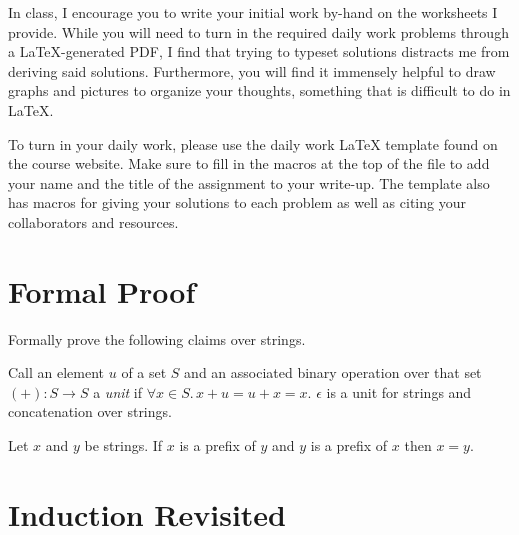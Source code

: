 \documentclass[11pt]{book}
\begin{document}
In class, I encourage you to write your initial work by-hand on the worksheets I provide.
While you will need to turn in the required daily work problems through a \LaTeX{}-generated PDF, I find that trying to typeset solutions distracts me from deriving said solutions.
Furthermore, you will find it immensely helpful to draw graphs and pictures to organize your thoughts, something that is difficult to do in \LaTeX{}.

To turn in your daily work, please use the daily work \LaTeX{} template found on the course website.
Make sure to fill in the macros at the top of the file to add your name and the title of the assignment to your write-up.
The template also has macros for giving your solutions to each problem as well as citing your collaborators and resources.

\newpage

\section{Formal Proof}

Formally prove the following claims over strings.

\begin{claim}
  Call an element \( u \) of a set \( S \) and an associated binary operation over that set \( (+) : S → S \) a \emph{unit} if \( ∀x ∈ S.\, x + u = u + x = x \).
  \( ϵ \) is a unit for strings and concatenation over strings.
\end{claim}

\begin{claim}
  Let \( x \) and \( y \) be strings.
  If \( x \) is a prefix of \( y \) and \( y \) is a prefix of \( x \) then \( x = y \).
\end{claim}

\newpage

\section{Induction Revisited}
\end{document}
